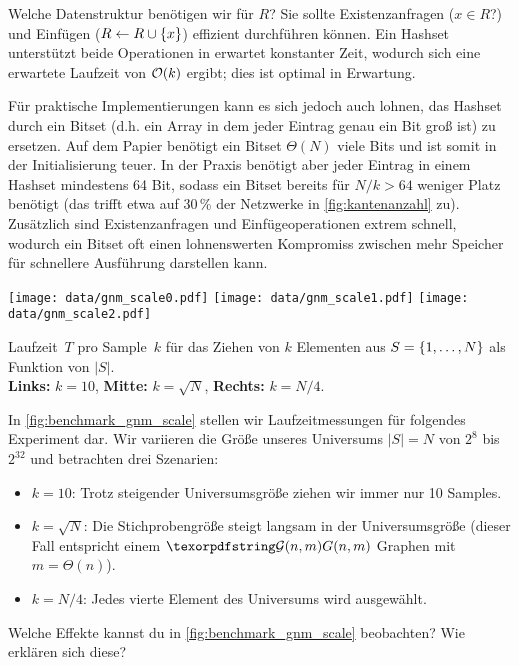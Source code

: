Welche Datenstruktur benötigen wir für $R$? Sie sollte Existenzanfragen ($x \in R$?) und Einfügen ($R \gets R \cup \left\{x\right\}$) effizient durchführen können.
Ein Hashset unterstützt beide Operationen in erwartet konstanter Zeit, wodurch sich eine erwartete Laufzeit von $\mathcal{O}\!\left(k\right)$ ergibt; dies ist optimal in Erwartung.

Für praktische Implementierungen kann es sich jedoch auch lohnen, das Hashset durch ein Bitset (d.h. ein Array in dem jeder Eintrag genau ein Bit groß ist) zu ersetzen.
Auf dem Papier benötigt ein Bitset $\Theta(N)$ viele Bits und ist somit in der Initialisierung teuer.
In der Praxis benötigt aber jeder Eintrag in einem Hashset mindestens 64 Bit, sodass ein Bitset bereits für $N / k > 64$ weniger Platz benötigt (das trifft etwa auf 30\,\% der Netzwerke in \cref{fig:kantenanzahl} zu).
Zusätzlich sind Existenzanfragen und Einfügeoperationen extrem schnell, wodurch ein Bitset oft einen lohnenswerten Kompromiss zwischen mehr Speicher für schnellere Ausführung darstellen kann.

\begin{widefigure}
    \texttt{[image: data/gnm\_scale0.pdf]}\hfill
    \texttt{[image: data/gnm\_scale1.pdf]}\hfill
    \texttt{[image: data/gnm\_scale2.pdf]}

    \caption{
        Laufzeit~$T$ pro Sample~$k$ für das Ziehen von $k$ Elementen aus $S = \left\{1, \ldots, N\right\}$ als Funktion von $|S|$.\\
        \textbf{Links:} $k=10$, \textbf{Mitte: } $k = \sqrt{N}$, \textbf{Rechts: } $k = N / 4$.
    }
    \label{fig:benchmark_gnm_scale}
\end{widefigure}

In \cref{fig:benchmark_gnm_scale} stellen wir Laufzeitmessungen für folgendes Experiment dar.
Wir variieren die Größe unseres Universums $|S| = N$ von $2^8$ bis $2^{32}$ und betrachten drei Szenarien:
\begin{itemize}
    \item $k=10$: Trotz steigender Universumsgröße ziehen wir immer nur 10 Samples.
    \item $k=\sqrt{N}$: Die Stichprobengröße steigt langsam in der Universumsgröße (dieser Fall entspricht einem $\Gnm$ Graphen mit $m = \Theta(n)$).
    \item $k=N/4$: Jedes vierte Element des Universums wird ausgewählt.
\end{itemize}

\begin{exercise}
    Welche Effekte kannst du in \cref{fig:benchmark_gnm_scale} beobachten? Wie erklären sich diese?
\end{exercise}

